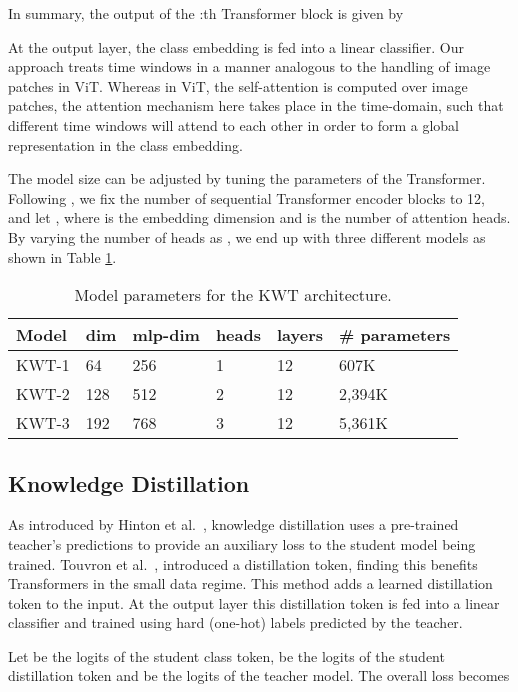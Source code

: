 \documentclass[a4paper]{article}
\begin{document}
In summary, the output of the :th Transformer block is given by

At the output layer, the class embedding is fed into a linear classifier. Our approach treats time windows in a manner analogous to the handling of image patches in ViT. Whereas in ViT, the self-attention is computed over image patches, the attention mechanism here takes place in the time-domain, such that different time windows will attend to each other in order to form a global representation in the class embedding.

The model size can be adjusted by tuning the parameters of the Transformer. Following \cite{touvron2020training}, we fix the number of sequential Transformer encoder blocks to 12, and let , where  is the embedding dimension and  is the number of attention heads. By varying the number of heads as , we end up with three different models as shown in Table \ref{tab:params}.

\begin{table}[t]
	\caption{Model parameters for the KWT architecture.}
	\label{tab:params}
	\centering
	\begin{tabular}{llllll}
	\toprule
	\textbf{Model} & dim & mlp-dim & heads & layers &  \# parameters \\
	\midrule
	KWT-1 & 64 & 256 & 1 & 12 & 607K \\
	KWT-2 & 128 & 512 & 2 & 12 & 2,394K \\
	KWT-3 & 192 & 768 & 3 & 12 & 5,361K \\
	\bottomrule
	\end{tabular}
\end{table}

\subsection{Knowledge Distillation}

As introduced by Hinton et al.\ \cite{hinton2015distill}, knowledge distillation uses a pre-trained teacher's predictions to provide an auxiliary loss to the student model being trained. Touvron et al.\ \cite{touvron2020training}, introduced a distillation token, finding this benefits Transformers in the small data regime. This method adds a learned distillation token to the input. At the output layer this distillation token is fed into a linear classifier and trained using hard (one-hot) labels predicted by the teacher.

Let  be the logits of the student class token,  be the logits of the student distillation token and  be the logits of the teacher model. The overall loss becomes
\end{document}
